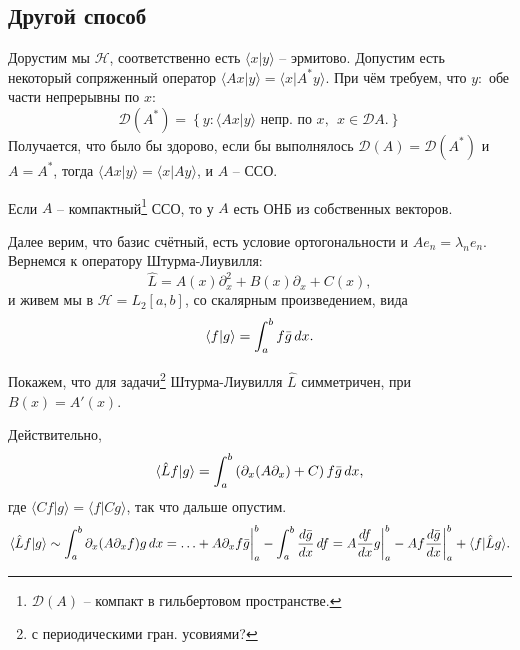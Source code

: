 \subsection{Другой способ}

Дорустим мы $\mathcal H$, соответственно есть $\langle x | y\rangle$ -- эрмитово. Допустим есть некоторый сопряженный оператор $\langle A x | y\rangle = \langle x | A^* y \rangle$. При чём требуем, что $y \colon $ обе части непрерывны по $x$:
\begin{equation*}
    \mathcal D (A^*) = \left\{
        y \colon  \langle A x | y\rangle \text{ непр. по } x,
        \ \ x \in \mathcal D A.
    \right\}
\end{equation*}
Получается, что было бы здорово, если бы выполнялось $\mathcal D (A) = \mathcal D(A^*)$ и $A = A^*$, тогда $\langle A x | y\rangle = \langle x | A y\rangle$, и $A$ -- ССО.


\begin{to_thr}
    Если $A$ -- компактный\footnote{
        $\mathcal D (A)$ -- компакт в гильбертовом пространстве.
    }  ССО, то у $A$ есть ОНБ из собственных векторов. 
\end{to_thr}


Далее верим, что базис счётный, есть условие ортогональности и $A e_n = \lambda_n e_n$. Вернемся к оператору Штурма-Лиувилля:
\begin{equation*}
    \hat{L} = A(x) \partial_x^2 + B(x) \partial_x + C(x),
\end{equation*}
и живем мы в $\mathcal H = L_2[a, b]$, со скалярным произведением, вида
\begin{equation*}
    \langle f|g\rangle = \int_{a}^{b} f \bar{g} \, d x.
\end{equation*}

Покажем, что для задачи\footnote{
    с периодическими гран. усовиями?
}  Штурма-Лиувилля $\hat{L}$  симметричен, при $B(x) = A'(x)$. 

Действительно, 
\begin{equation*}
    \langle \hat{L} f | g\rangle = \int_{a}^{b} 
    \left(
        \partial_x (A \partial_x) + C 
    \right) f \bar{g} \, d x,
\end{equation*}
где  $\langle C f | g\rangle = \langle  f  | C g\rangle$, так что дальше опустим.
\begin{equation*}
    \langle \hat{L} f | g\rangle \sim
    \int_{a}^{b} \partial_x (A \partial_x f) g \, d x = 
    \ldots + A \partial_x f \bar{g} \bigg|_a^b - 
    \int_{a}^{b}  \frac{d \bar{g}}{d x}  \, d f = 
    A \frac{d f}{d x} g \bigg|_a^b - A f \frac{d \bar{g}}{d x}  \bigg|_a^b + \langle f | \hat{L} g\rangle.
\end{equation*}


